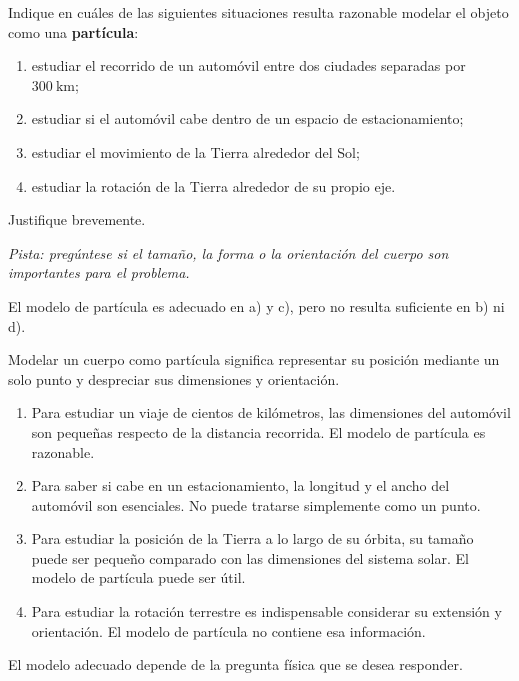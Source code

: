\begin{ejercicio}
Indique en cuáles de las siguientes situaciones resulta razonable modelar el objeto como una \textbf{partícula}:

\begin{enumerate}[label=\alph*)]
    \item estudiar el recorrido de un automóvil entre dos ciudades separadas por \(\SI{300}{\kilo\meter}\);
    \item estudiar si el automóvil cabe dentro de un espacio de estacionamiento;
    \item estudiar el movimiento de la Tierra alrededor del Sol;
    \item estudiar la rotación de la Tierra alrededor de su propio eje.
\end{enumerate}

Justifique brevemente.

\textit{Pista: pregúntese si el tamaño, la forma o la orientación del cuerpo son importantes para el problema.}
\end{ejercicio}

\begin{respuesta}
El modelo de partícula es adecuado en a) y c), pero no resulta suficiente en b) ni d).
\end{respuesta}

\begin{explicacion}
Modelar un cuerpo como partícula significa representar su posición mediante un solo punto y despreciar sus dimensiones y orientación.

\begin{enumerate}[label=\alph*)]
    \item Para estudiar un viaje de cientos de kilómetros, las dimensiones del automóvil son pequeñas respecto de la distancia recorrida. El modelo de partícula es razonable.

    \item Para saber si cabe en un estacionamiento, la longitud y el ancho del automóvil son esenciales. No puede tratarse simplemente como un punto.

    \item Para estudiar la posición de la Tierra a lo largo de su órbita, su tamaño puede ser pequeño comparado con las dimensiones del sistema solar. El modelo de partícula puede ser útil.

    \item Para estudiar la rotación terrestre es indispensable considerar su extensión y orientación. El modelo de partícula no contiene esa información.
\end{enumerate}

El modelo adecuado depende de la pregunta física que se desea responder.
\end{explicacion}


